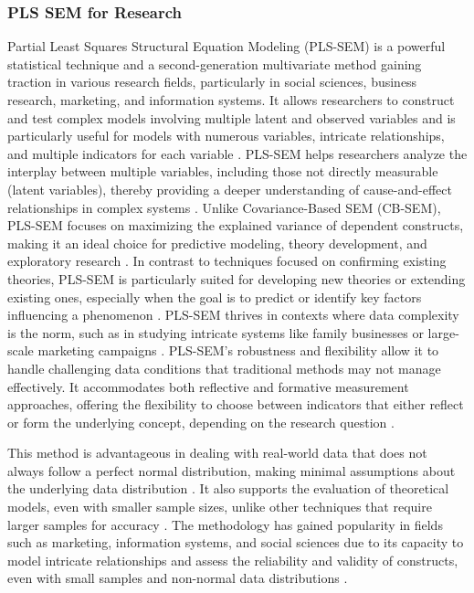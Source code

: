 \subsubsection{PLS SEM for Research}

Partial Least Squares Structural Equation Modeling (PLS-SEM) is a powerful statistical technique and a second-generation multivariate method gaining traction in various research fields, particularly in social sciences, business research, marketing, and information systems. It allows researchers to construct and test complex models involving multiple latent and observed variables and is particularly useful for models with numerous variables, intricate relationships, and multiple indicators for each variable \parencite{Sarstedt2017PartialModeling, Henseler2015AModeling}. PLS-SEM helps researchers analyze the interplay between multiple variables, including those not directly measurable (latent variables), thereby providing a deeper understanding of cause-and-effect relationships in complex systems \parencite{Sarstedt2017PartialModeling}. Unlike Covariance-Based SEM (CB-SEM), PLS-SEM focuses on maximizing the explained variance of dependent constructs, making it an ideal choice for predictive modeling, theory development, and exploratory research \parencite{Chin1998TheModeling} \parencite{Sarstedt2017PartialModeling}. In contrast to techniques focused on confirming existing theories, PLS-SEM is particularly suited for developing new theories or extending existing ones, especially when the goal is to predict or identify key factors influencing a phenomenon \parencite{Chin1998TheModeling}. PLS-SEM thrives in contexts where data complexity is the norm, such as in studying intricate systems like family businesses or large-scale marketing campaigns \parencite{Henseler2015AModeling}. PLS-SEM's robustness and flexibility allow it to handle challenging data conditions that traditional methods may not manage effectively. It accommodates both reflective and formative measurement approaches, offering the flexibility to choose between indicators that either reflect or form the underlying concept, depending on the research question \parencite{Chin1998TheModeling}. 

This method is advantageous in dealing with real-world data that does not always follow a perfect normal distribution, making minimal assumptions about the underlying data distribution \parencite{Lohmoller1989LatentSquares}. It also supports the evaluation of theoretical models, even with smaller sample sizes, unlike other techniques that require larger samples for accuracy \parencite{Sarstedt2017PartialModeling}. The methodology has gained popularity in fields such as marketing, information systems, and social sciences due to its capacity to model intricate relationships and assess the reliability and validity of constructs, even with small samples and non-normal data distributions \parencite{Chin1998TheModeling}. 

